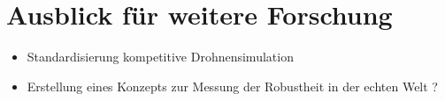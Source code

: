 \section{Ausblick für weitere Forschung}

\begin{itemize}
    \item Standardisierung kompetitive Drohnensimulation
    \item Erstellung eines Konzepts zur Messung der Robustheit in der echten Welt ?
\end{itemize}